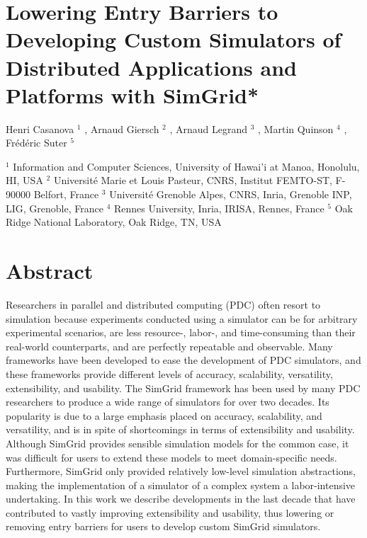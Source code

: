 \documentclass[
]{article}
\author{}
\date{}
\begin{document}
\section{Lowering Entry Barriers to Developing Custom Simulators of
Distributed Applications and Platforms with
SimGrid*}\label{lowering-entry-barriers-to-developing-custom-simulators-of-distributed-applications-and-platforms-with-simgrid}

Henri Casanova \(^{1}\) , Arnaud Giersch \(^{2}\) , Arnaud Legrand
\(^{3}\) , Martin Quinson \(^{4}\) , Frédéric Suter \(^{5}\)

\(^{1}\) Information and Computer Sciences, University of Hawai'i at
Manoa, Honolulu, HI, USA \(^{2}\) Université Marie et Louis Pasteur,
CNRS, Institut FEMTO-ST, F-90000 Belfort, France \(^{3}\) Université
Grenoble Alpes, CNRS, Inria, Grenoble INP, LIG, Grenoble, France
\(^{4}\) Rennes University, Inria, IRISA, Rennes, France \(^{5}\) Oak
Ridge National Laboratory, Oak Ridge, TN, USA

\section{Abstract}\label{abstract}

Researchers in parallel and distributed computing (PDC) often resort to
simulation because experiments conducted using a simulator can be for
arbitrary experimental scenarios, are less resource-, labor-, and
time-consuming than their real-world counterparts, and are perfectly
repeatable and observable. Many frameworks have been developed to ease
the development of PDC simulators, and these frameworks provide
different levels of accuracy, scalability, versatility, extensibility,
and usability. The SimGrid framework has been used by many PDC
researchers to produce a wide range of simulators for over two decades.
Its popularity is due to a large emphasis placed on accuracy,
scalability, and versatility, and is in spite of shortcomings in terms
of extensibility and usability. Although SimGrid provides sensible
simulation models for the common case, it was difficult for users to
extend these models to meet domain-specific needs. Furthermore, SimGrid
only provided relatively low-level simulation abstractions, making the
implementation of a simulator of a complex system a labor-intensive
undertaking. In this work we describe developments in the last decade
that have contributed to vastly improving extensibility and usability,
thus lowering or removing entry barriers for users to develop custom
SimGrid simulators.
\end{document}
